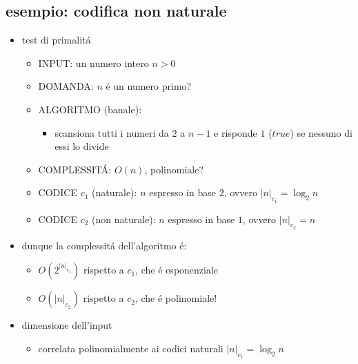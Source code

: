 \subsection*{esempio: codifica non naturale}
\begin{flushleft}
	\begin{itemize}
		\item test di primalit\'a
		\begin{itemize}
			\item INPUT: un numero intero $n>0$ 
			\item DOMANDA: $n$ \'e un numero primo?
			\item ALGORITMO (banale):
			\begin{itemize}
				\item scansiona tutti i numeri da $2$ a $n-1$ e risponde $1$ ($true$) se nessuno di essi lo divide
			\end{itemize}
			\item COMPLESSIT\'A: $O(n)$, polinomiale?
			\item CODICE $c_1$ (naturale): $n$ espresso in base $2$, ovvero $|n|_{c_1}=\log_2{n}$
			\item CODICE $c_2$ (non naturale): $n$ espresso in base $1$, ovvero $|n|_{c_2}=n$
		\end{itemize}
		\item dunque la complessit\'a dell'algoritmo \'e:
		\begin{itemize}
			\item $O(2^{|n|_{c_1}})$ rispetto a $c_1$, che \'e esponenziale
			\item $O(|n|_{c_2})$ rispetto a $c_2$, che \'e polinomiale!
		\end{itemize}
		\item dimensione dell'input
			\begin{itemize}
				\item correlata polinomialmente ai codici naturali $|n|_{c_1}=\log_2{n}$
			\end{itemize}
	\end{itemize}
\end{flushleft}


